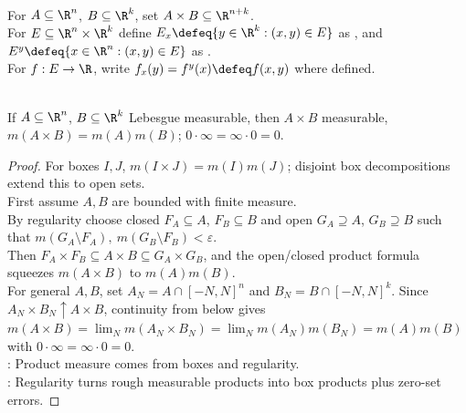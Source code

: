 \begin{definition} \label{def:lebesgue-product-slices} \\
For $A\subseteq\R^n$, $B\subseteq\R^k$, set $A\times B\subseteq\R^{n+k}$.\\
For $E\subseteq\R^n\times\R^k$ define $E_x\defeq\{y\in\R^k:(x,y)\in E\}$ as , and  $E^y\defeq\{x\in\R^n:(x,y)\in E\}$ as .\\
For $f:E\to\R$, write $f_x(y)=f^y(x)\defeq f(x,y)$ where defined.
\end{definition}

\begin{theorem} \label{thm:measurable-products-product-measure} \\
If $A\subseteq\R^n$, $B\subseteq\R^k$ Lebesgue measurable, then $A\times B$ measurable, $m(A\times B)=m(A)m(B)$; $0\cdot\infty=\infty\cdot0=0$.
\begin{proof}
For boxes $I,J$, $m(I\times J)=m(I)m(J)$; disjoint box decompositions extend this to open sets.\\
First assume $A,B$ are bounded with finite measure.\\
By regularity choose closed $F_A\subseteq A$, $F_B\subseteq B$ and open $G_A\supseteq A$, $G_B\supseteq B$ such that $m(G_A\setminus F_A),\ m(G_B\setminus F_B)<\varepsilon$.\\
Then $F_A\times F_B\subseteq A\times B\subseteq G_A\times G_B$, and the open/closed product formula squeezes $m(A\times B)$ to $m(A)m(B)$.\\
For general $A,B$, set $A_N=A\cap[-N,N]^n$ and $B_N=B\cap[-N,N]^k$. Since $A_N\times B_N\uparrow A\times B$, continuity from below gives $m(A\times B)=\lim_N m(A_N\times B_N)=\lim_N m(A_N)m(B_N)=m(A)m(B)$ with $0\cdot\infty=\infty\cdot0=0$.\\
: Product measure comes from boxes and regularity.\\
: Regularity turns rough measurable products into box products plus zero-set errors.
\end{proof}
\end{theorem}

